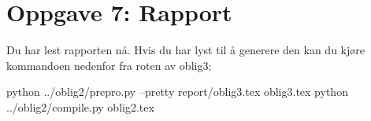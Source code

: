 \section*{Oppgave 7: Rapport}

Du har lest rapporten nå. Hvis du har lyst til å generere den kan du kjøre kommandoen nedenfor fra roten av oblig3;

python ../oblig2/prepro.py --pretty report/oblig3.tex oblig3.tex
python ../oblig2/compile.py oblig2.tex
